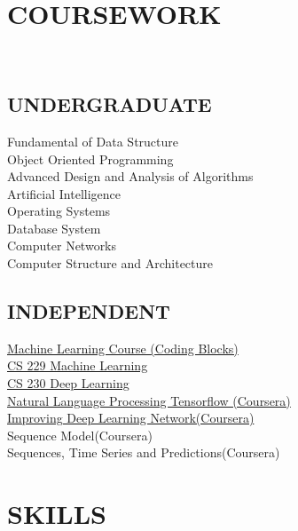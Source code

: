 \documentclass[]{deedy-resume-openfont}
\begin{document}
\begin{minipage}[t]{0.33\textwidth}

\section{COURSEWORK}
\quad \\
\subsection{UNDERGRADUATE}

Fundamental of Data Structure \\
Object Oriented Programming \\ 
Advanced Design and Analysis of Algorithms \\ 
Artificial Intelligence \\ 
Operating Systems \\ 
Database System \\ 
Computer Networks \\ 
Computer Structure and Architecture \\ 

\sectionsep

\subsection{INDEPENDENT}

\href{https://online.codingblocks.com/app/certificates/CBOL-26635-2848}{Machine Learning Course (Coding Blocks)} \\
\href{http://cs229.stanford.edu/}{CS 229 Machine Learning} \\
\href{https://cs230.stanford.edu/}{CS 230 Deep Learning} \\
\href{https://coursera.org/share/0d85004d7396f79556aa1a92de8a3ab5}{Natural Language Processing Tensorflow (Coursera)} \\
\href{https://coursera.org/share/bf38126b8c3094913923da5075b257d5}{Improving Deep Learning Network(Coursera)} \\
Sequence Model(Coursera) \\
Sequences, Time Series and Predictions(Coursera) \\



\section{SKILLS}

\end{minipage}
\end{document}
